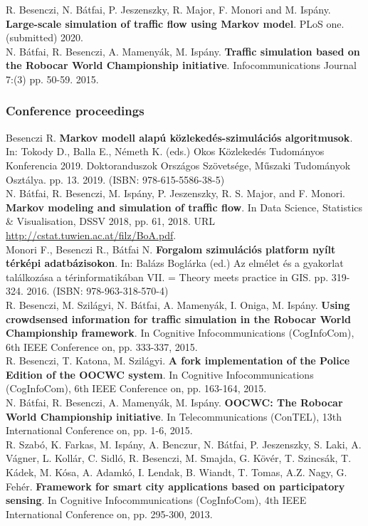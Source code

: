 \documentclass[b5paper,12pt]{report}
\theoremstyle{definition}
\begin{document}
\begin{singlespace}
\small
\noindent
R. Besenczi, N. Bátfai, P. Jeszenszky, R. Major, F. Monori and M. Ispány. {\bf{Large-scale simulation of traffic flow using Markov model}}. PLoS one. (submitted) 2020.
\\[10pt]
\noindent
N. Bátfai, R. Besenczi, A. Mamenyák, M. Ispány. {\bf{Traffic simulation based on the Robocar World Championship initiative}}. Infocommunications Journal 7:(3) pp. 50-59. 2015.

\subsubsection*{Conference proceedings}

\noindent
Besenczi R. {\bf{Markov modell alapú közlekedés-szimulációs algoritmusok}}. In: Tokody D., Balla E., Németh K. (eds.) Okos Közlekedés Tudományos Konferencia 2019. Doktoranduszok Országos Szövetsége, Műszaki Tudományok Osztálya. pp. 13. 2019. (ISBN: 978-615-5586-38-5)
\\[10pt]
\noindent
N. Bátfai, R. Besenczi, M. Ispány, P. Jeszenszky, R. S. Major, and F. Monori. {\bf{Markov modeling and simulation of traffic flow}}. In Data Science, Statistics \& Visualisation, DSSV 2018, pp. 61, 2018. URL \url{http://cstat.tuwien.ac.at/filz/BoA.pdf}.
\\[10pt]
\noindent
Monori F., Besenczi R., Bátfai N. {\bf{Forgalom szimulációs platform nyílt térképi adatbázisokon}}. In: Balázs Boglárka (ed.) Az elmélet és a gyakorlat találkozása a térinformatikában VII. = Theory meets practice in GIS. pp. 319-324. 2016. (ISBN: 978-963-318-570-4)
\\[10pt]
\noindent
R. Besenczi, M. Szilágyi, N. Bátfai, A. Mamenyák, I. Oniga, M. Ispány. {\bf{Using crowdsensed information for traffic simulation in the Robocar World Championship framework}}. In Cognitive Infocommunications (CogInfoCom), 6th IEEE Conference on, pp. 333-337, 2015.
\\[10pt]
\noindent
R. Besenczi, T. Katona, M. Szilágyi. {\bf{A fork implementation of the Police Edition of the OOCWC system}}. In Cognitive Infocommunications (CogInfoCom), 6th IEEE Conference on, pp. 163-164, 2015.
\\[10pt]
\noindent
N. Bátfai, R. Besenczi, A. Mamenyák, M. Ispány. {\bf{OOCWC: The Robocar World Championship initiative}}. In Telecommunications (ConTEL), 13th International Conference on, pp. 1-6, 2015.
\\[10pt]
\noindent
R. Szabó, K. Farkas, M. Ispány, A. Benczur, N. Bátfai, P. Jeszenszky, S. Laki, A. Vágner, L. Kollár, C. Sidló, R. Besenczi, M. Smajda, G. Kövér, T. Szincsák, T. Kádek, M. Kósa, A. Adamkó, I. Lendak, B. Wiandt, T. Tomas, A.Z. Nagy, G. Fehér. {\bf{Framework for smart city applications based on participatory sensing}}. In Cognitive Infocommunications (CogInfoCom), 4th IEEE International Conference on, pp. 295-300, 2013.


\end{singlespace}
\end{document}

